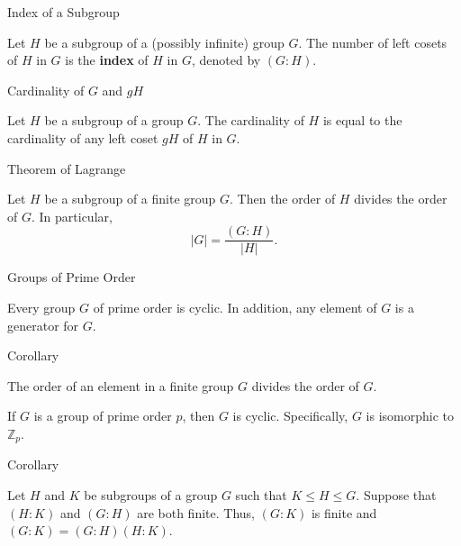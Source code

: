 \documentclass{beamer}
\begin{document}
\begin{frame}{Index of a Subgroup}
\begin{definition}
\justifying
Let $H$ be a subgroup of a (possibly infinite) group $G$. The number of left cosets of $H$ in $G$ is the \textbf{index} of $H$ in $G$, denoted by $(G:H)$.
\end{definition}
\end{frame}

\begin{frame}{Cardinality of $G$ and $gH$}
\begin{lemma}
\justifying
Let $H$ be a subgroup of a group $G$. The cardinality of $H$ is equal to the cardinality of any left coset $gH$ of $H$ in $G$. 
\end{lemma}
\end{frame}

\begin{frame}{Theorem of Lagrange}
\begin{theorem}
Let $H$ be a subgroup of a finite group $G$. Then the order of $H$ divides the order of $G$. In particular, 
\[
|G| = \dfrac{(G:H)}{|H|}.
\]
\end{theorem}
\end{frame}

\begin{frame}{Groups of Prime Order}
\begin{corollary}
Every group $G$ of prime order is cyclic. In addition, any element of $G$ is a generator for $G$.
\end{corollary}    
\end{frame}

\begin{frame}{Corollary}
\begin{corollary}
The order of an element in a finite group $G$ divides the order of $G$.    
\end{corollary}
\begin{corollary}
\justifying
    If $G$ is a group of prime order $p$, then $G$ is cyclic. Specifically, $G$ is isomorphic to $\mathbb{Z}_p$.
\end{corollary}
\end{frame}

\begin{frame}{Corollary}
\begin{corollary}
\justifying
Let $H$ and $K$ be subgroups of a group $G$ such that $K \leq H \leq G$. Suppose that $(H:K)$ and $(G:H)$ are both finite. Thus, $(G:K)$ is finite and $(G:K) = (G:H)(H:K)$.
\end{corollary}    
\end{frame}
\end{document}
